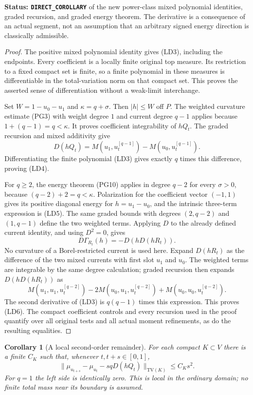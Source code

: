 \documentclass[11pt,a4paper]{article}
\numberwithin{equation}{section}
\newtheorem{corollary}[theorem]{Corollary}
\theoremstyle{definition}
\theoremstyle{remark}
\begin{document}
\noindent\textbf{Status: \texttt{DIRECT\_COROLLARY}} of the new
power-class mixed polynomial identities, graded recursion, and graded
energy theorem.  The derivative is a consequence of an actual segment,
not an assumption that an arbitrary signed energy direction is
classically admissible.

\begin{proof}
The positive mixed polynomial identity gives (LD3), including the
endpoints.  Every coefficient is a locally finite original top
measure.  Its restriction to a fixed compact set is finite, so a finite
polynomial in these measures is differentiable in the total-variation
norm on that compact set.  This proves the asserted sense of
differentiation without a weak-limit interchange.

Set $W=1-u_0-u_1$ and $\kappa=q+\sigma$.  Then $|h|\le W$ off $P$.
The weighted curvature estimate (PG3) with weight degree $1$ and
current degree $q-1$ applies because $1+(q-1)=q<\kappa$.
It proves coefficient integrability of $hQ_t$.  The graded recursion
and mixed additivity give
\[
 D(hQ_t)=M(u_1,u_t^{[q-1]})-M(u_0,u_t^{[q-1]}).
 \tag{LD7}
\]
Differentiating the finite polynomial (LD3) gives exactly $q$ times
this difference, proving (LD4).

For $q\ge2$, the energy theorem (PG10) applies in degree $q-2$ for
every $\sigma>0$, because $(q-2)+2=q<\kappa$.  Polarization for
the coefficient vector $(-1,1)$ gives its positive diagonal energy
for $h=u_1-u_0$, and the intrinsic three-term expression is (LD5).
The same graded bounds with degrees $(2,q-2)$ and $(1,q-1)$ define
the two weighted terms.  Applying $D$ to the already defined current
identity, and using $D^2=0$, gives
\[
                  D\Gamma_{R_t}(h)=-D(hD(hR_t)).
 \tag{LD8}
\]
No curvature of a Borel-restricted current is used here.
Expand $D(hR_t)$ as the difference of the two mixed currents with
first slot $u_1$ and $u_0$.  The weighted terms are integrable by the
same degree calculation; graded recursion then expands
$D(hD(hR_t))$ as
\[
 M(u_1,u_1,u_t^{[q-2]})
 -2M(u_0,u_1,u_t^{[q-2]})
 +M(u_0,u_0,u_t^{[q-2]}).
\]
The second derivative of (LD3) is $q(q-1)$ times this expression.
This proves (LD6).  The compact coefficient controls and every
recursion used in the proof quantify over all original tests and all
actual moment refinements, as do the resulting equalities.
\end{proof}

\begin{corollary}[A local second-order remainder]
\label{cor:r11-power-segment-remainder}
For each compact $K\subset V$ there is a finite $C_K$ such that,
whenever $t,t+s\in[0,1]$,
\[
 \big\|\mu_{u_{t+s}}-\mu_{u_t}-sqD(hQ_t)\big\|_{\mathrm{TV}(K)}
                                                    \le C_Ks^2.
 \tag{LD9}
\]
For $q=1$ the left side is identically zero.  This is local in the
ordinary domain; no finite total mass near its boundary is assumed.
\end{corollary}
\end{document}
